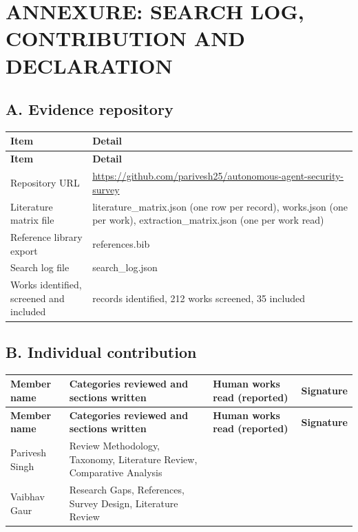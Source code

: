 \label{annex:start}
\section*{ANNEXURE: SEARCH LOG, CONTRIBUTION AND DECLARATION}
\subsection*{A. Evidence repository}
\begingroup
\fontsize{9}{10.5}\selectfont
\setlength{\tabcolsep}{1.4mm}
\renewcommand{\arraystretch}{1.08}
\begin{longtable}{|>{\raggedright\arraybackslash}p{49.19mm}|>{\raggedright\arraybackslash}p{114.77mm}|}
\hline
\rowcolor{navy}\color{white}\bfseries Item & \color{white}\bfseries Detail\\\hline
\endfirsthead
\hline
\rowcolor{navy}\color{white}\bfseries Item & \color{white}\bfseries Detail\\\hline
\endhead
\endfoot
\endlastfoot
Repository URL & \url{https://github.com/parivesh25/autonomous-agent-security-survey}\\\hline
Literature matrix file & literature\_matrix.json (one row per record), works.json (one per work), extraction\_matrix.json (one per work read)\\\hline
Reference library export & references.bib\\\hline
Search log file & search\_log.json\\\hline
Works identified, screened and included & 234 records identified, 212 works screened, 35 included\\\hline
\end{longtable}
\endgroup

\subsection*{B. Individual contribution}
\begingroup
\fontsize{9}{10.5}\selectfont
\setlength{\tabcolsep}{1.4mm}
\renewcommand{\arraystretch}{1.08}
\begin{longtable}{|>{\raggedright\arraybackslash}p{28.45mm}|>{\raggedright\arraybackslash}p{90.09mm}|>{\raggedright\arraybackslash}p{23.71mm}|>{\raggedright\arraybackslash}p{15.81mm}|}
\hline
\rowcolor{navy}\color{white}\bfseries Member name & \color{white}\bfseries Categories reviewed and sections written & \color{white}\bfseries Human works read (reported) & \color{white}\bfseries Signature\\\hline
\endfirsthead
\hline
\rowcolor{navy}\color{white}\bfseries Member name & \color{white}\bfseries Categories reviewed and sections written & \color{white}\bfseries Human works read (reported) & \color{white}\bfseries Signature\\\hline
\endhead
\endfoot
\endlastfoot
Parivesh Singh & Review Methodology, Taxonomy, Literature Review, Comparative Analysis & 7 & \\\hline
Vaibhav Gaur & Research Gaps, References, Survey Design, Literature Review & 3 & \\\hline
\end{longtable}
\endgroup

